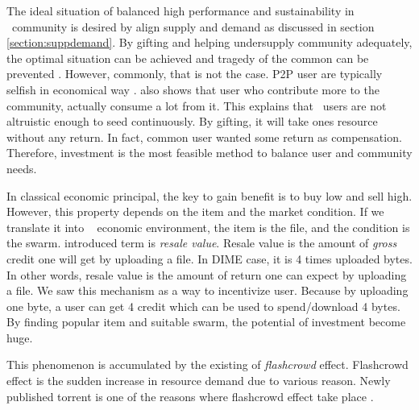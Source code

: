 The ideal situation of balanced high performance and sustainability in \bt~community is desired by align supply and demand as discussed in section \ref{section:suppdemand}. By gifting and helping undersupply community adequately, the optimal situation can be achieved and tragedy of the common can be prevented \cite{2002:reputationtotragedy:milinski}. However, commonly, that is not the case. P2P user are typically selfish in economical way \cite{2014:userbehaviourprivate:jia}. \citeauthor{2009:demandsupplyres:andrade} also shows that user who contribute more to the community, actually consume a lot from it. This explains that \bt~users are not altruistic enough to seed continuously. By gifting, it will take ones resource without any return. In fact, common user wanted some return as compensation. Therefore, investment is the most feasible method to balance user and community needs.

In classical economic principal, the key to gain benefit is to buy low and sell high. However, this property depends on the item and the market condition. If we translate it into \bt~ economic environment, the item is the file, and the condition is the swarm. \citeauthor{2012:economicbt:kash} introduced term is \textit{resale value}. Resale value is the amount of \textit{gross} credit one will get by uploading a file. In DIME case, it is 4 times uploaded bytes. In other words, resale value is the amount of return one can expect by uploading a file. We saw this mechanism as a way to incentivize user. Because by uploading one byte, a user can get 4 credit which can be used to spend/download 4 bytes. By finding popular item and suitable swarm, the potential of investment become huge.

This phenomenon is accumulated by the existing of \textit{flashcrowd} effect. Flashcrowd effect is the sudden increase in resource demand due to various reason. Newly published torrent is one of the reasons where flashcrowd effect take place \cite{2013:swarmevolution:su}. 

%

